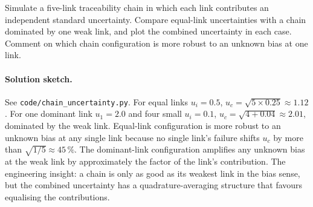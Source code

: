 \begin{exercise}
Simulate a five-link traceability chain in which each link
contributes an independent standard uncertainty. Compare equal-link
uncertainties with a chain dominated by one weak link, and plot
the combined uncertainty in each case. Comment on which chain
configuration is more robust to an unknown bias at one link.

\paragraph{Solution sketch.} See \texttt{code/chain\_uncertainty.py}.
For equal links $u_i = 0.5$, $u_c = \sqrt{5 \times 0.25} \approx
1.12$. For one dominant link $u_1 = 2.0$ and four small $u_i = 0.1$,
$u_c = \sqrt{4 + 0.04} \approx 2.01$, dominated by the weak link.
Equal-link configuration is more robust to an unknown bias at any
single link because no single link's failure shifts $u_c$ by more
than $\sqrt{1/5} \approx 45\,\%$. The dominant-link configuration
amplifies any unknown bias at the weak link by approximately the
factor of the link's contribution. The engineering insight: a chain
is only as good as its weakest link in the bias sense, but the
combined uncertainty has a quadrature-averaging structure that
favours equalising the contributions.
\end{exercise}

